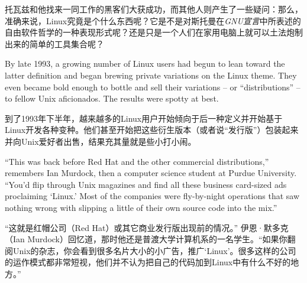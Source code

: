 \ifdefined\chs
托瓦兹和他找来一同工作的黑客们大获成功，而其他人则产生了一些疑问：那么，准确来说，Linux究竟是个什么东西呢？它是不是对斯托曼在\textit{GNU宣言}中所表述的自由软件哲学的一种表现形式呢？还是只是一个人们在家用电脑上就可以土法炮制出来的简单的工具集合呢？
\fi

\ifdefined\eng
By late 1993, a growing number of Linux users had begun to lean toward the latter definition and began brewing private variations on the Linux theme. They even became bold enough to bottle and sell their variations -- or ``distributions'' -- to fellow Unix aficionados. The results were spotty at best.
\fi

\ifdefined\chs
到了1993年下半年，越来越多的Linux用户开始倾向于后一种定义并开始基于Linux开发各种变种。他们甚至开始把这些衍生版本（或者说``发行版''）包装起来并向Unix爱好者出售，结果充其量就是些小打小闹。
\fi

\ifdefined\eng
``This was back before Red Hat and the other commercial distributions,'' remembers Ian Murdock, then a computer science student at Purdue University. ``You'd flip through Unix magazines and find all these business card-sized ads proclaiming `Linux.' Most of the companies were fly-by-night operations that saw nothing wrong with slipping a little of their own source code into the mix.''
\fi

\ifdefined\chs
``这就是红帽公司（Red Hat）或其它商业发行版出现前的情况。'' 伊恩·默多克（Ian Murdock）回忆道，那时他还是普渡大学计算机系的一名学生。``如果你翻阅Unix的杂志，你会看到很多名片大小的小广告，推广`Linux'。很多这样的公司的运作模式都非常短视，他们并不认为把自己的代码加到Linux中有什么不好的地方。''
\fi

